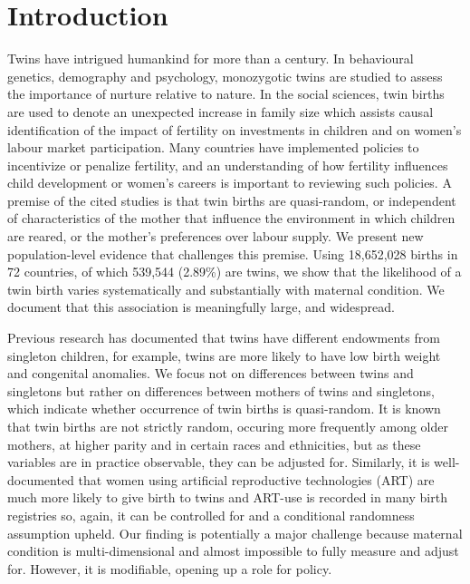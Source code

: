 \documentclass[11pt]{article}
\begin{document}
\section*{Introduction}
Twins have intrigued humankind for more than a century\cite{Thorndike1905}. In behavioural genetics, demography and psychology, monozygotic twins are studied to assess the importance of nurture relative to nature\cite{Thorndike1905,Boomsmaetal2002,Poldermanetal2015,Phillips1993,BouchardPropping1993,McClearnetal1997,Nisen2013}. In the social sciences, twin births are used to denote an unexpected increase in family size which assists causal identification of the impact of fertility on investments in children and on women's labour market participation\cite{WolpinRosenzweig2000,RosenzweigWolpin1980,BronarsGrogger1994}. Many countries have implemented policies to incentivize or penalize fertility, and an understanding of how fertility influences child development or women's careers is important to reviewing such policies. A premise of the cited studies is that twin births are quasi-random, or independent of characteristics of the mother that influence the environment in which children are reared, or the mother's preferences over labour supply. We present new population-level evidence that challenges this premise. Using 18,652,028 births in 72 countries, of which 539,544 (2.89\%) are twins, we show that the likelihood of a twin birth varies systematically and substantially with maternal condition. We document that this association is meaningfully large, and widespread.

Previous research has documented that twins have different endowments from singleton children, for example, twins are more likely to have low birth weight and congenital anomalies\cite{Hall2003}. We focus not on differences between twins and singletons but rather on differences between mothers of twins and singletons, which indicate whether occurrence of twin births is quasi-random. It is known that twin births are not strictly random, occuring more frequently among older mothers, at higher parity and in certain races and ethnicities\cite{Hall2003, Bulmer1970}, but as these variables are in practice observable, they can be adjusted for. Similarly, it is well-documented that women using artificial reproductive technologies (ART) are much more likely to give birth to twins\cite{Vitthalaetal2009} and ART-use is recorded in many birth registries so, again, it can be controlled for and a conditional randomness assumption upheld. Our finding is potentially a major challenge because maternal condition is multi-dimensional and almost impossible to fully measure and adjust for. However, it is modifiable, opening up a role for policy.
\end{document}
